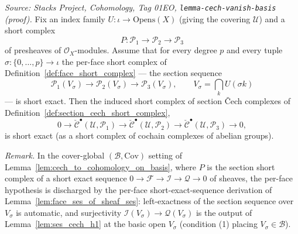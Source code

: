 \begin{lemma}

  \label{lem:cech_ses_of_basis}
  \textit{Source: Stacks Project, Cohomology, Tag 01EO,
  \texttt{lemma-cech-vanish-basis} (proof).}
  Fix an index family \(U : \iota \to \mathrm{Opens}(X)\) (giving the covering \(\mathcal{U}\)) and a
  short complex
  \[
    P : \mathcal{P}_1 \to \mathcal{P}_2 \to \mathcal{P}_3
  \]
  of presheaves of \(\mathcal{O}_X\)-modules. Assume that for every degree \(p\) and every tuple
  \(\sigma : \{0, \ldots, p\} \to \iota\) the per-face short complex of
  Definition~\ref{def:face_short_complex} — the section sequence
  \[
    \mathcal{P}_1(V_\sigma) \longrightarrow \mathcal{P}_2(V_\sigma) \longrightarrow
      \mathcal{P}_3(V_\sigma), \qquad V_\sigma = \bigcap_k U(\sigma k)
  \]
  — is short exact. Then the induced short complex of section {\v C}ech complexes of
  Definition~\ref{def:section_cech_short_complex},
  \[
    0 \to \check{\mathcal{C}}^\bullet(\mathcal{U}, \mathcal{P}_1) \to
      \check{\mathcal{C}}^\bullet(\mathcal{U}, \mathcal{P}_2) \to
      \check{\mathcal{C}}^\bullet(\mathcal{U}, \mathcal{P}_3) \to 0,
  \]
  is short exact (as a short complex of cochain complexes of abelian groups).

  \emph{Remark.} In the cover-global \((\mathcal{B}, \mathrm{Cov})\) setting of
  Lemma~\ref{lem:cech_to_cohomology_on_basis}, where \(P\) is the section short complex of a short
  exact sequence \(0 \to \mathcal{F} \to \mathcal{I} \to \mathcal{Q} \to 0\) of sheaves, the per-face
  hypothesis is discharged by the per-face short-exact-sequence derivation of
  Lemma~\ref{lem:face_ses_of_sheaf_ses}: left-exactness of the section sequence over \(V_\sigma\) is
  automatic, and surjectivity \(\mathcal{I}(V_\sigma) \to \mathcal{Q}(V_\sigma)\) is the output of
  Lemma~\ref{lem:ses_cech_h1} at the basic open \(V_\sigma\) (condition (1) placing \(V_\sigma \in
  \mathcal{B}\)).
\end{lemma}

